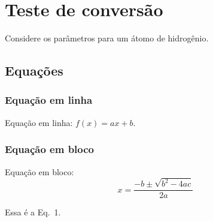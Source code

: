 \hypertarget{teste-de-conversuxe3o}{%
\section{Teste de conversão}\label{teste-de-conversuxe3o}}

Considere os parâmetros para um átomo de hidrogênio.

\hypertarget{equauxe7uxf5es}{%
\subsection{Equações}\label{equauxe7uxf5es}}

\hypertarget{equauxe7uxe3o-em-linha}{%
\subsubsection{Equação em linha}\label{equauxe7uxe3o-em-linha}}

Equação em linha: \(f(x) = ax + b\).

\hypertarget{equauxe7uxe3o-em-bloco}{%
\subsubsection{Equação em bloco}\label{equauxe7uxe3o-em-bloco}}

Equação em bloco: \protect\hypertarget{eq:eq1}{}{\[
    x = \dfrac{ -b \pm \sqrt{b^2 - 4 ac} }{ 2a }
\tag{1}\]}

Essa é a Eq.~1.